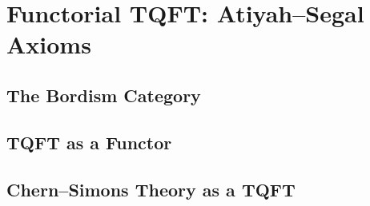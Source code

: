 %
%
%

\section{Functorial TQFT: Atiyah--Segal Axioms}


\subsection{The Bordism Category}

%

\subsection{TQFT as a Functor}

%

\subsection{Chern--Simons Theory as a TQFT}

%
%

